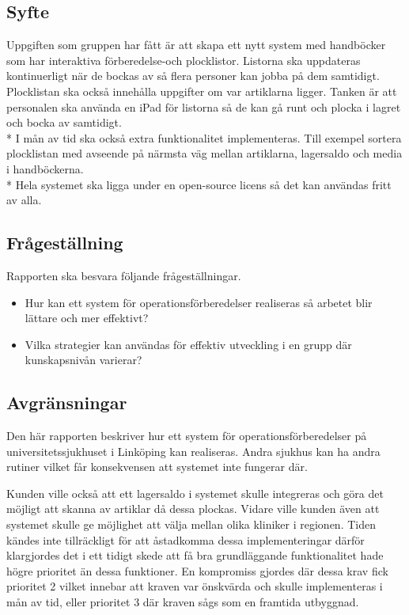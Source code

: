 \documentclass{article}
\begin{document}
\subsection{Syfte}
Uppgiften som gruppen har fått är att skapa ett nytt system med handböcker som har interaktiva förberedelse-och plocklistor. Listorna ska uppdateras kontinuerligt när de bockas av så flera personer kan jobba på dem samtidigt. Plocklistan ska också innehålla uppgifter om var artiklarna ligger. Tanken är att personalen 
ska använda en iPad för listorna så de kan gå runt och plocka i lagret och bocka av samtidigt. \\*
I mån av tid ska också extra funktionalitet implementeras. Till exempel sortera plocklistan med avseende på närmsta väg mellan artiklarna, lagersaldo och media i handböckerna. \\*
Hela systemet ska ligga under en open-source licens så det kan användas fritt av alla.    
\subsection{Frågeställning}
Rapporten ska besvara följande frågeställningar.
\begin{itemize}
\item Hur kan ett system för operationsförberedelser realiseras så arbetet blir lättare och mer effektivt?
\item Vilka strategier kan användas för effektiv utveckling i en grupp där kunskapsnivån varierar? 
\end{itemize}

\subsection{Avgränsningar}
Den här rapporten beskriver hur ett system för operationsförberedelser på universitetssjukhuset i Linköping kan realiseras. Andra sjukhus kan ha andra rutiner vilket får konsekvensen att systemet inte fungerar där.

Kunden ville också att ett lagersaldo i systemet skulle integreras och göra det möjligt att skanna av artiklar då dessa plockas. Vidare ville kunden även att systemet skulle ge möjlighet att välja mellan olika kliniker i regionen. Tiden kändes inte tillräckligt för att åstadkomma dessa implementeringar därför klargjordes det i ett tidigt skede att få bra grundläggande funktionalitet hade högre prioritet än dessa funktioner. En kompromiss gjordes där dessa krav fick prioritet 2 vilket innebar att kraven var önskvärda och skulle implementeras i mån av tid, eller prioritet 3 där kraven sågs som en framtida utbyggnad.
\end{document}
